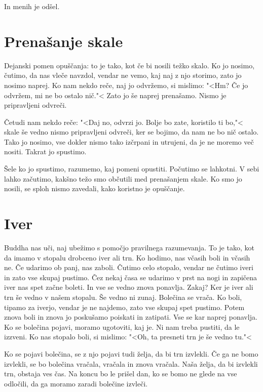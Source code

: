 In menih je odšel.

\section{Prenašanje skale}

Dejanski pomen opuščanja: to je tako, kot če bi nosili težko skalo. Ko jo nosimo, čutimo, da nas vleče navzdol, vendar ne vemo, kaj naj z njo storimo, zato jo nosimo naprej. Ko nam nekdo reče, naj jo odvržemo, si mislimo: "<Hm? Če jo odvržem, mi ne bo ostalo nič."< Zato jo še naprej prenašamo. Nismo je pripravljeni odvreči.

Četudi nam nekdo reče: "<Daj no, odvrzi jo. Bolje bo zate, koristilo ti bo,"< skale še vedno nismo pripravljeni odvreči, ker se bojimo, da nam ne bo nič ostalo. Tako jo nosimo, vse dokler nismo tako izčrpani in utrujeni, da je ne moremo več nositi. Takrat jo spustimo.

Šele ko jo spustimo, razumemo, kaj pomeni opustiti. Počutimo se lahkotni. V sebi lahko začutimo, kakšno težo smo občutili med prenašanjem skale. Ko smo jo nosili, se sploh nismo zavedali, kako koristno je opuščanje.

\section{Iver}

Buddha nas uči, naj ubežimo s pomočjo pravilnega razumevanja. To je tako, kot da imamo v stopalu drobceno iver ali trn. Ko hodimo, nas včasih boli in včasih ne. Če udarimo ob panj, nas zaboli. Čutimo celo stopalo, vendar ne čutimo iveri in zato vse skupaj pustimo. Čez nekaj časa se udarimo v prst na nogi in zapičena iver nas spet začne boleti. In vse se vedno znova ponavlja. Zakaj? Ker je iver ali trn še vedno v našem stopalu. Še vedno ni zunaj. Bolečina se vrača. Ko boli, tipamo za iverjo, vendar je ne najdemo, zato vse skupaj spet pustimo. Potem znova boli in znova jo poskušamo poiskati in zatipati. Vse se kar naprej ponavlja. Ko se bolečina pojavi, moramo ugotoviti, kaj je. Ni nam treba pustiti, da le izzveni. Ko nas stopalo boli, si mislimo: "<Oh, ta presneti trn je še vedno tu."<

Ko se pojavi bolečina, se z njo pojavi tudi želja, da bi trn izvlekli. Če ga ne bomo izvlekli, se bo bolečina vračala, vračala in znova vračala. Naša želja, da bi izvlekli trn, obstaja ves čas. Na koncu bo le prišel dan, ko se bomo ne glede na vse odločili, da ga moramo zaradi bolečine izvleči.

